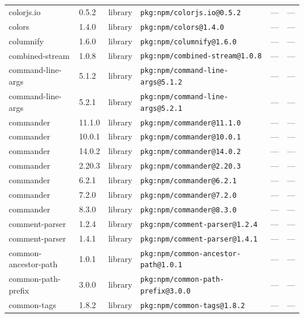 \documentclass[11pt,a4paper]{article}
\begin{document}
\begin{longtable}{|p{4cm}|p{2cm}|p{1.6cm}|p{5cm}|p{1.5cm}|p{3.5cm}|}
\raggedright colorjs.io & 0.5.2 & library & \small\texttt{pkg:npm/colorjs.io@0.5.2} & — & \small — \\
\raggedright colors & 1.4.0 & library & \small\texttt{pkg:npm/colors@1.4.0} & — & \small — \\
\raggedright columnify & 1.6.0 & library & \small\texttt{pkg:npm/columnify@1.6.0} & — & \small — \\
\raggedright combined-stream & 1.0.8 & library & \small\texttt{pkg:npm/combined-stream@1.0.8} & — & \small — \\
\raggedright command-line-args & 5.1.2 & library & \small\texttt{pkg:npm/command-line-args@5.1.2} & — & \small — \\
\raggedright command-line-args & 5.2.1 & library & \small\texttt{pkg:npm/command-line-args@5.2.1} & — & \small — \\
\raggedright commander & 11.1.0 & library & \small\texttt{pkg:npm/commander@11.1.0} & — & \small — \\
\raggedright commander & 10.0.1 & library & \small\texttt{pkg:npm/commander@10.0.1} & — & \small — \\
\raggedright commander & 14.0.2 & library & \small\texttt{pkg:npm/commander@14.0.2} & — & \small — \\
\raggedright commander & 2.20.3 & library & \small\texttt{pkg:npm/commander@2.20.3} & — & \small — \\
\raggedright commander & 6.2.1 & library & \small\texttt{pkg:npm/commander@6.2.1} & — & \small — \\
\raggedright commander & 7.2.0 & library & \small\texttt{pkg:npm/commander@7.2.0} & — & \small — \\
\raggedright commander & 8.3.0 & library & \small\texttt{pkg:npm/commander@8.3.0} & — & \small — \\
\raggedright comment-parser & 1.2.4 & library & \small\texttt{pkg:npm/comment-parser@1.2.4} & — & \small — \\
\raggedright comment-parser & 1.4.1 & library & \small\texttt{pkg:npm/comment-parser@1.4.1} & — & \small — \\
\raggedright common-ancestor-path & 1.0.1 & library & \small\texttt{pkg:npm/common-ancestor-path@1.0.1} & — & \small — \\
\raggedright common-path-prefix & 3.0.0 & library & \small\texttt{pkg:npm/common-path-prefix@3.0.0} & — & \small — \\
\raggedright common-tags & 1.8.2 & library & \small\texttt{pkg:npm/common-tags@1.8.2} & — & \small — \\

\end{longtable}
\end{document}
